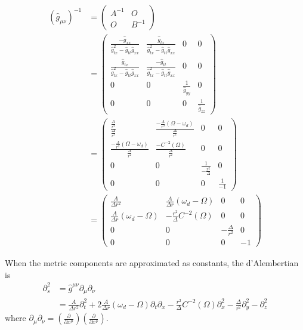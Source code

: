 \documentclass[english]{article}
\begin{document}
\begin{align*}
\left(\hat{g}_{\mu\nu}\right)^{-1} & =\begin{pmatrix}A^{-1} & O\\
O & B^{-1}
\end{pmatrix}\\
 & =\begin{pmatrix}\frac{-\hat{g}_{xx}}{\hat{g}^{2}_{tx}-\hat{g}_{tt}\hat{g}_{xx}} & \frac{\hat{g}_{tx}}{\hat{g}^{2}_{tx}-\hat{g}_{tt}\hat{g}_{xx}} & 0 & 0\\
\frac{\hat{g}_{tx}}{\hat{g}^{2}_{tx}-\hat{g}_{tt}\hat{g}_{xx}} & \frac{-\hat{g}_{tt}}{\hat{g}^{2}_{tx}-\hat{g}_{tt}\hat{g}_{xx}} & 0 & 0\\
0 & 0 & \frac{1}{\hat{g}_{yy}} & 0\\
0 & 0 & 0 & \frac{1}{\hat{g}_{zz}}
\end{pmatrix}\\
 & =\begin{pmatrix}\frac{\frac{A}{r^{4}}}{\frac{\Delta}{r^{2}}} & \frac{-\frac{A}{r^{3}}\left(\Omega-\omega_{d}\right)}{\frac{\Delta}{r^{2}}} & 0 & 0\\
\frac{-\frac{A}{r^{3}}\left(\Omega-\omega_{d}\right)}{\frac{\Delta}{r^{2}}} & \frac{-C^{-2}\left(\Omega\right)}{\frac{\Delta}{r^{2}}} & 0 & 0\\
0 & 0 & \frac{1}{-\frac{r^{2}}{\Delta}} & 0\\
0 & 0 & 0 & \frac{1}{-1}
\end{pmatrix}\\
 & =\begin{pmatrix}\frac{A}{\Delta r^{2}} & \frac{A}{\Delta r}\left(\omega_{d}-\Omega\right) & 0 & 0\\
\frac{A}{\Delta r}\left(\omega_{d}-\Omega\right) & -\frac{r^{2}}{\Delta}C^{-2}\left(\Omega\right) & 0 & 0\\
0 & 0 & -\frac{\Delta}{r^{2}} & 0\\
0 & 0 & 0 & -1
\end{pmatrix}
\end{align*}

When the metric components are approximated as constants, the d'Alembertian
is 
\begin{align*}
\partial^{2}_{s} & =\hat{g}^{\mu\nu}\partial_{\mu}\partial_{\nu}\\
 & =\frac{A}{\Delta r^{2}}\partial^{2}_{t}+2\frac{A}{\Delta r}\left(\omega_{d}-\Omega\right)\partial_{t}\partial_{x}-\frac{r^{2}}{\Delta}C^{-2}\left(\Omega\right)\partial^{2}_{x}-\frac{\Delta}{r^{2}}\partial^{2}_{y}-\partial^{2}_{z}
\end{align*}
 where $\partial_{\mu}\partial_{\nu}=\left(\frac{\partial}{\partial x^{\mu}}\right)\left(\frac{\partial}{\partial x^{\nu}}\right)$.
\end{document}
